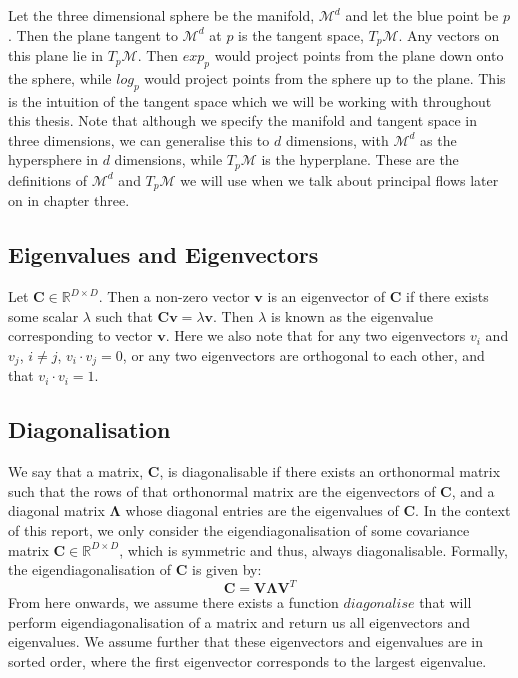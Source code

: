 \documentclass[12pt]{report}
\begin{document}
\fi
Let the three dimensional sphere be the manifold,
$\mathcal{M}^d$ and let the blue point be $p$.
Then the plane tangent to $\mathcal{M}^d$ at $p$ 
is the tangent space, $T_p\mathcal{M}$. Any vectors on
this plane lie in $T_p\mathcal{M}$. Then $exp_p$ would 
project points from the plane down onto the sphere, 
while $log_p$ would project points from the sphere 
up to the plane. This is the intuition of the tangent space
which we will be working with throughout this thesis.
Note that although we specify the 
manifold and tangent space in three dimensions, 
we can generalise this to $d$ dimensions, with $\mathcal{M}^d$
as the hypersphere in $d$ dimensions, while $T_p\mathcal{M}$ 
is the hyperplane. These are the definitions of $\mathcal{M}^d$
and $T_p\mathcal{M}$ we will use 
when we talk about principal flows later on in chapter three.

\newpage
 
\subsection{Eigenvalues and Eigenvectors}
Let $\mathbf{C} \in \mathbb{R}^{D \times D}$. 
Then a non-zero vector $\mathbf{v}$ is an eigenvector of $\mathbf{C}$ 
if there exists some scalar $\lambda$ such that $\mathbf{C}\mathbf{v} = \lambda \mathbf{v}$. 
Then $\lambda$ is known as the eigenvalue corresponding to vector $\mathbf{v}$.
Here we also note that for any two eigenvectors $v_i$ and $v_j$, $i \neq j$, $v_i \cdot v_j = 0$, 
or any two eigenvectors are orthogonal to each other, and that $v_i \cdot v_i = 1$.

\subsection{Diagonalisation}
We say that a matrix, $\mathbf{C}$, is diagonalisable if there exists 
an orthonormal matrix such that the rows of that orthonormal matrix 
are the eigenvectors of $\mathbf{C}$, and a diagonal matrix 
$\mathbf{\Lambda}$ whose diagonal entries are the eigenvalues of $\mathbf{C}$.
In the context of this report, we only consider 
the eigendiagonalisation of some covariance matrix 
$\mathbf{C} \in \mathbb{R}^{D \times D}$,
which is symmetric and thus, always diagonalisable. Formally,
the eigendiagonalisation of $\mathbf{C}$ is given by:
$$\mathbf{C} = \mathbf{V}\mathbf{\Lambda}\mathbf{V}^T$$
From here onwards, we assume there exists a function $diagonalise$ that
will perform eigendiagonalisation of a matrix and return us 
all eigenvectors and eigenvalues. We assume further that these
eigenvectors and eigenvalues are in sorted order, where 
the first eigenvector corresponds to the largest eigenvalue.
\end{document}
